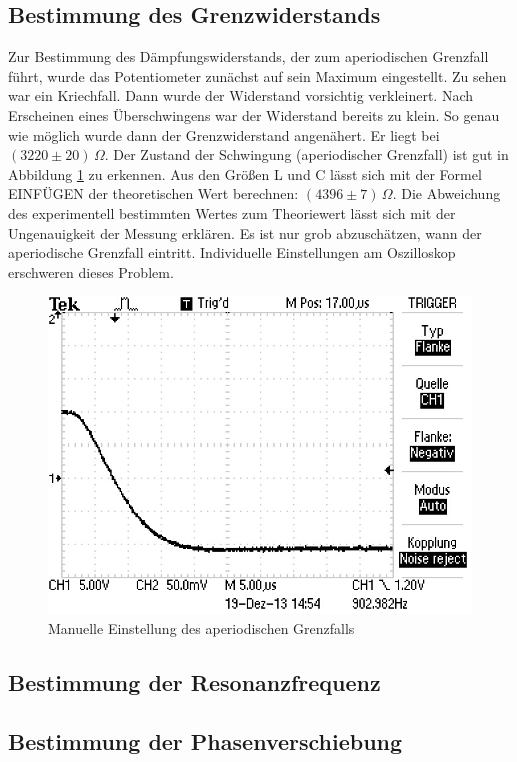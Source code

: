 \documentclass[11pt,ngerman,a4paper]{article}
\begin{document}
\subsection{Bestimmung des Grenzwiderstands}
Zur Bestimmung des Dämpfungswiderstands, der zum aperiodischen Grenzfall führt, wurde das Potentiometer zunächst auf sein Maximum eingestellt. Zu sehen war ein Kriechfall. Dann wurde der Widerstand vorsichtig verkleinert. Nach Erscheinen eines Überschwingens war der Widerstand bereits zu klein. So genau wie möglich wurde dann der Grenzwiderstand angenähert. Er liegt bei $(3220 \pm 20) \, \Omega$. Der Zustand der Schwingung (aperiodischer Grenzfall) ist gut in Abbildung \ref{apgrenzfall} zu erkennen. Aus den Größen L und C lässt sich mit der Formel EINFÜGEN der theoretischen Wert berechnen: $(4396\pm7)\,\Omega$. Die Abweichung des experimentell bestimmten Wertes zum Theoriewert lässt sich mit der Ungenauigkeit der Messung erklären. Es ist nur grob abzuschätzen, wann der aperiodische Grenzfall eintritt. Individuelle Einstellungen am Oszilloskop erschweren dieses Problem.
\begin{figure}[h]
\centering
\includegraphics[scale=0.5]{apgrenzfall.png}
\caption{Manuelle Einstellung des aperiodischen Grenzfalls}
\label{apgrenzfall}
\end{figure}
\subsection{Bestimmung der Resonanzfrequenz}
\subsection{Bestimmung der Phasenverschiebung}
\end{document}
